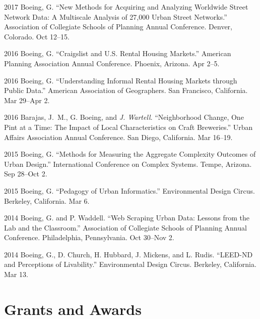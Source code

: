 \documentclass[12pt,letterpaper]{report}
\begin{document}
\begin{tablist}
		\item[2017] \tab Boeing, G. \enquote{New Methods for Acquiring and Analyzing Worldwide Street Network Data: A Multiscale Analysis of 27,000 Urban Street Networks.} Association of Collegiate Schools of Planning Annual Conference. Denver, Colorado. Oct 12--15.
		
		\item[2016] \tab Boeing, G. \enquote{Craigslist and U.S. Rental Housing Markets.} American Planning Association Annual Conference. Phoenix, Arizona. Apr 2--5.
		
		\item[2016] \tab Boeing, G. \enquote{Understanding Informal Rental Housing Markets through Public Data.} American Association of Geographers. San Francisco, California. Mar 29--Apr 2.
		
		\item[2016] \tab Barajas, J.~M., G. Boeing, and \textit{J. Wartell}. \enquote{Neighborhood Change, One Pint at a Time: The Impact of Local Characteristics on Craft Breweries.} Urban Affairs Association Annual Conference. San Diego, California. Mar 16--19.
		
		\item[2015] \tab Boeing, G. \enquote{Methods for Measuring the Aggregate Complexity Outcomes of Urban Design.} International Conference on Complex Systems. Tempe, Arizona. Sep 28--Oct 2.
		
		\item[2015] \tab Boeing, G. \enquote{Pedagogy of Urban Informatics.} Environmental Design Circus. Berkeley, California. Mar 6.
		
		\item[2014] \tab Boeing, G. and P. Waddell. \enquote{Web Scraping Urban Data: Lessons from the Lab and the Classroom.} Association of Collegiate Schools of Planning Annual Conference. Philadelphia, Pennsylvania. Oct 30--Nov 2.
		
		\item[2014] \tab Boeing, G., D. Church, H. Hubbard, J. Mickens, and L. Rudis. \enquote{LEED-ND and Perceptions of Livability.} Environmental Design Circus. Berkeley, California. Mar 13.
		
	\end{tablist}
	
	
	
	\section*{Grants and Awards}
	
\end{document}
